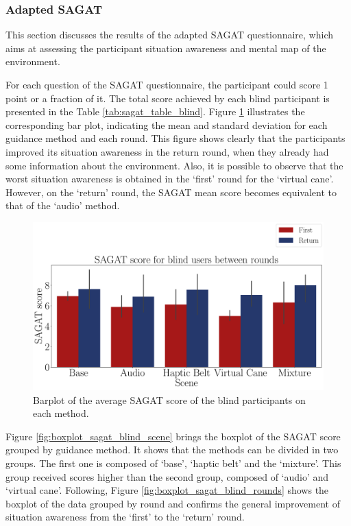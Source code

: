 \subsubsection{Adapted SAGAT}
\label{subsubsec:results_adapted_sagat_1}

This section discusses the results of the adapted SAGAT questionnaire, which aims at assessing the participant situation awareness and mental map of the environment. 

For each question of the SAGAT questionnaire, the participant could score 1 point or a fraction of it. The total score achieved by each blind participant is presented in the Table \ref{tab:sagat_table_blind}. Figure  \ref{fig:barplot_sagat_avg_5_scene_blind} illustrates the corresponding bar plot, indicating the mean and standard deviation for each guidance method and each round. This figure shows clearly that the participants improved its situation awareness in the return round, when they already had some information about the environment. Also, it is possible to observe that the worst situation awareness is obtained in the ‘first’ round for the ‘virtual cane’. However, on the ‘return’ round, the SAGAT mean score becomes equivalent to that of the ‘audio’ method.



\begin{figure}[!htb]
    \centering
    \includegraphics[width = \textwidth]{Resultados/Sagat/Figuras/pdf/barplot_sagat_avg_5_scene_blind.pdf}
    \caption{Barplot of the average SAGAT score of the blind participants on each method.}
    \label{fig:barplot_sagat_avg_5_scene_blind}
\end{figure}

Figure \ref{fig:boxplot_sagat_blind_scene} brings the boxplot of the SAGAT score grouped by guidance method. It shows that the methods can be divided in two groups. The first one is composed of ‘base’, ‘haptic belt’ and the ‘mixture’. This group received scores higher than the second group, composed of ‘audio’ and ‘virtual cane’. Following, Figure \ref{fig:boxplot_sagat_blind_rounds} shows the boxplot of the data grouped by round and confirms the general improvement of situation awareness from the ‘first’ to the ‘return’ round. 

